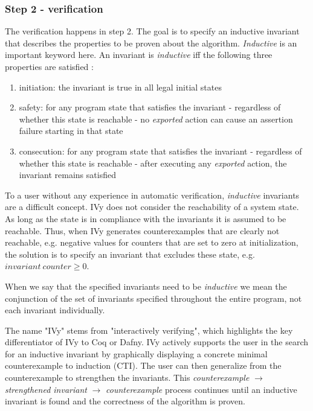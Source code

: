 \documentclass[fleqn]{article}
\begin{document}
\subsubsection{Step 2 - verification}
The verification happens in step 2. The goal is to specify an inductive invariant that describes the properties to be proven about the algorithm. \textit{Inductive} is an important
keyword here. An invariant is \textit{inductive} iff the following three properties are satisfied \cite{invariants}:
\begin{enumerate}
  \item initiation: the invariant is true in all legal initial states
  \item safety: for any program state that satisfies the invariant - regardless of whether this state is reachable - no \textit{exported} action can cause an assertion failure starting in that state
  \item consecution: for any program state that satisfies the invariant - regardless of whether this state is reachable - after executing any \textit{exported} action, the invariant remains satisfied
\end{enumerate}
To a user without any experience in automatic verification, \textit{inductive} invariants are a difficult concept.
IVy does not consider the reachability of a system state.  As long as the state is in compliance with the invariants it is assumed to be reachable.
Thus, when IVy generates counterexamples that are clearly not reachable, e.g. negative values for counters that are set to zero at initialization, the solution is to specify an invariant that excludes these state, e.g. $invariant\ counter \geq 0$.

When we say that the specified invariants need to be \textit{inductive} we mean the conjunction of the set of invariants specified throughout the entire program, not each invariant individually.

The name "IVy" stems from "interactively verifying", which highlights the key differentiator of IVy to Coq or Dafny.\cite{ivy}
IVy actively supports the user in the search for an inductive invariant by graphically displaying a concrete minimal counterexample to induction (CTI).
The user can then generalize from the counterexample to strengthen the invariants. This \textit{counterexample} $\rightarrow$ \textit{strengthened invariant} $\rightarrow$ \textit{counterexample} process continues
until an inductive invariant is found and the correctness of the algorithm is proven.
\end{document}
